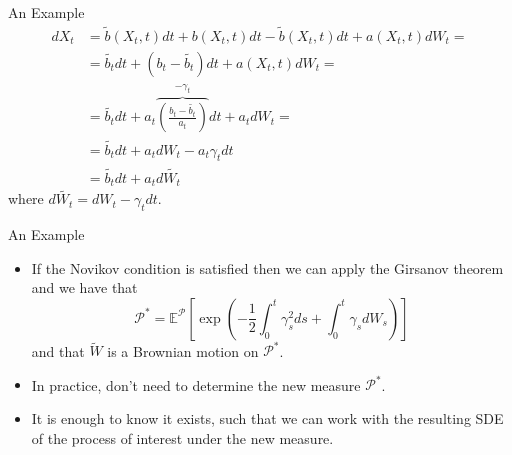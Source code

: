 \documentclass{beamer}
\begin{document}
\begin{frame}{An Example}
  \begin{equation*}
    \begin{aligned}
      dX_t &= \tilde{b}(X_t,t) dt+b(X_t,t) dt -\tilde{b}(X_t,t) dt + a(X_t,t) dW_t = \\
      &=\tilde{b_t} dt + (b_t -\tilde{b_t})dt + a(X_t,t) dW_t =\\
      &=\tilde{b_t}dt+ a_t\overbrace{\left(\frac{b_t-\tilde{b_t}}{a_t}\right)}^{-\gamma_t}dt + a_t dW_t = \\
      &= \tilde{b_t}dt+a_t dW_t - a_t\gamma_t dt\\
      &=\tilde{b_t}dt+a_t d\tilde{W_t}
    \end{aligned}
  \end{equation*}
  where $d\tilde{W_t}=dW_t-\gamma_t dt$.
\end{frame}

\begin{frame}{An Example}
  \begin{itemize}
  \item<1-> If the Novikov condition is satisfied then we can apply the Girsanov theorem and we have that
    \begin{equation}
      \mathcal{P}^* = \mathbb{E}^\mathcal{P}\left[\exp\left(-\frac{1}{2}\int_0^t \gamma_s^2 ds + \int_0^t \gamma_s dW_s \right)\right]
    \end{equation}
    and that $\tilde{W}$ is a Brownian motion on $\mathcal{P}^*$.
  \item<2-> In practice, don't need to determine the new measure $\mathcal{P}^*$.
  \item<3-> It is enough to know it exists, such that we can work with the resulting SDE of the process of interest under the new measure.	
  \end{itemize}
\end{frame}
\end{document}
